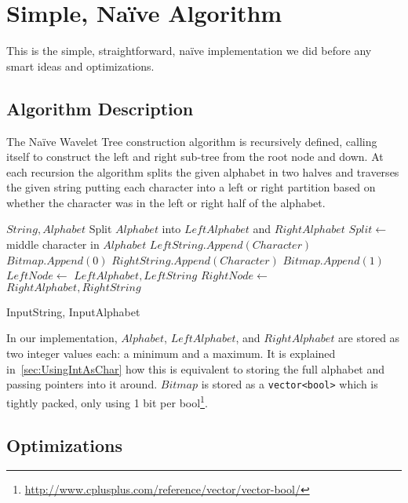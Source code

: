 \section{Simple, Naïve Algorithm}
This is the simple, straightforward, naïve implementation we did before any smart ideas and optimizations.
\subsection{Algorithm Description}
The Naïve Wavelet Tree construction algorithm is recursively defined, calling itself to construct the left and right sub-tree from the root node and down. At each recursion the algorithm splits the given alphabet in two halves and traverses the given string putting each character into a left or right partition based on whether the character was in the left or right half of the alphabet.

\begin{mdframed}[nobreak]
\begin{algorithmic}
 {$String, Alphabet$}
	\State \Return
\EndIf
\State Split $Alphabet$ into $LeftAlphabet$ and $RightAlphabet$
\State $Split \gets$ middle character in $Alphabet$
		\State $LeftString.Append(Character)$
		\State $Bitmap.Append(0)$
	\Else
		\State $RightString.Append(Character)$
		\State $Bitmap.Append(1)$
	\EndIf
\EndFor
\State $LeftNode \gets$  {$LeftAlphabet, LeftString$}
\State $RightNode \gets$  {$RightAlphabet, RightString$}
\EndFunction

\State {} {InputString, InputAlphabet}
\end{algorithmic}
\end{mdframed}

\noindent In our implementation, $Alphabet$, $LeftAlphabet$, and $RightAlphabet$ are stored as two integer values each: a minimum and a maximum. It is explained in~\ref{sec:UsingIntAsChar} how this is equivalent to storing the full alphabet and passing pointers into it around. $Bitmap$ is stored as a \texttt{vector<bool>} which is tightly packed, only using 1 bit per bool\footnote{\url{http://www.cplusplus.com/reference/vector/vector-bool/}}.

\subsection{Optimizations}

